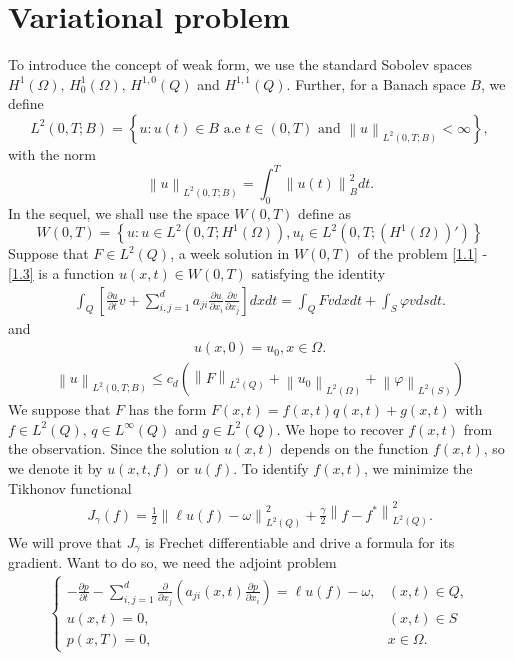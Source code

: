 \documentclass[]{article}
\begin{document}
\section{Variational problem}
To introduce the concept of weak form, we use the standard Sobolev spaces $H^1(\Omega),\, H^1_0(\Omega),\, H^{1, 0}(Q)$ and $H^{1, 1}(Q)$. Further, for a Banach space $B$, we define
$$L^2(0, T; B)=\left\{u:u(t)\in B \text{ a.e } t\in (0, T) \text{ and } \left\|u\right\|_{L^2(0, T; B)} <\infty \right\},$$
with the norm
$$\left\|u\right\|_{L^2(0, T; B)}=\int_0^T\left\|u(t)\right\|^2_Bdt.$$
In the sequel, we shall use the space $W(0, T)$ define as
$$W(0, T)=\left\{u: u\in L^2(0, T; H^1(\Omega)), u_t\in L^2\left(0, T; \left(H^1(\Omega)\right)'\right) \right\}$$
Suppose that $F\in L^2(Q)$, a week solution in $W(0, T)$ of the problem \eqref{1.1} - \eqref{1.3} is a function $u(x, t)\in W(0, T)$ satisfying the identity
\begin{align}\label{2.1}
	\int_{Q}\left[\frac{\partial u}{\partial t}v+\sum_{i, j=1}^{d}a_{ji}\frac{\partial u}{\partial x_i}\frac{\partial v}{\partial x_j}\right]dxdt=\int_{Q}Fvdxdt+\int_{S}\varphi vdsdt.
\end{align}
and 
\begin{align}\label{2.2}
	u(x, 0)=u_0, x\in \Omega.
\end{align}
\begin{align}\label{2.3}
	\left\|u\right\|_{L^2(0, T; B)} \leq c_d \left(\left\|F\right\|_{L^2(Q)}+\left\|u_0\right\|_{L^2(\Omega)}+\left\|\varphi\right\|_{L^2(S)}\right)
\end{align}
We suppose that $F$ has the form $F(x, t)=f(x, t)q(x, t)+g(x, t)$ with $f\in L^2(Q),\, q\in L^\infty(Q)$ and $g\in L^2(Q)$. We hope to recover $f(x, t)$ from the observation. Since the solution $u(x, t)$ depends on the function $f(x, t)$, so we denote it by $u(x, t, f)$ or $u(f)$. To identify $f(x, t)$, we minimize the Tikhonov functional
\begin{align}\label{2.4}
	J_{\gamma}(f)=\frac{1}{2}\left\|\ell u(f)-\omega\right\|_{L^2(Q)}^2+\frac{\gamma}{2}\left\|f-f^*\right\|_{L^2(Q)}^2.
\end{align}
We will prove that $J_\gamma$ is Frechet differentiable and drive a formula for its gradient. Want to do so, we need the adjoint problem
\begin{align}\label{2.5}
	\begin{cases}
		-\frac{\partial p}{\partial t}-\sum_{i, j=1}^{d}\frac{\partial}{\partial x_j}\left(a_{ji}(x, t)\frac{\partial p}{\partial x_i}\right)=\ell u(f)-\omega, & (x, t)\in Q,\\
		u(x, t)=0, & (x, t)\in S\\
		p(x, T)=0, & x\in \Omega.
	\end{cases}
\end{align}
\end{document}

